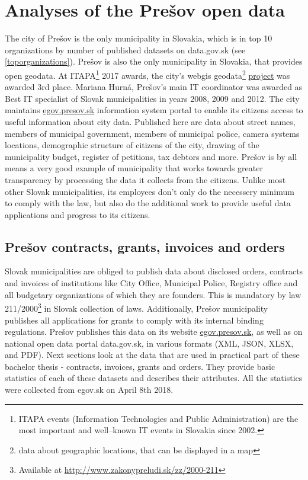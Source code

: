 \documentclass[thesis=B,english]{FITthesis}[2012/06/26]
\begin{document}
\chapter{Analyses of the Prešov open data}
\label{presovopendata}
	The city of Prešov is the only municipality in Slovakia, which is in top 10 organizations by number of published datasets on data.gov.sk (see \ref{toporganizations}). Prešov is also the only municipality in Slovakia, that provides open geodata. At ITAPA\footnote{ITAPA events (Information Technologies and Public Administration) are the most important and well–known IT events in Slovakia since 2002.\cite{itapa}} 2017 awards, the city's webgis geodata\footnote{data about geographic locations, that can be displayed in a map} \href{http://webgis.presov.sk/}{project} was awarded 3rd place. Mariana Hurná, Prešov's main IT coordinator was awarded as Best IT specialist of Slovak municipalities in years 2008, 2009 and 2012. The city maintains \href{http://egov.presov.sk}{egov.presov.sk} information system  portal to enable its citizens access to useful information about city data. Published here are data about street names, members of municipal government, members of municipal police, camera systems locations, demographic structure of citizens of the city, drawing of the municipality budget, register of petitions, tax debtors and more. Prešov is by all means a very good example of municipality that works towards greater  transparency by processing the data it collects from the citizens. Unlike most other Slovak municipalities, its employees don't only do the necessery minimum to comply with the law, but also do the additional work to provide useful data applications and progress to its citizens.
	
	\section{Prešov contracts, grants, invoices and orders}
	\label{presovdataattributes}
	Slovak municipalities are obliged to publish data about disclosed orders, contracts and invoices of institutions like City Office, Municipal Police, Registry office and all budgetary organizations of which they are founders. This is mandatory by law 211/2000\footnote{Available at \url{http://www.zakonypreludi.sk/zz/2000-211}} in Slovak collection of laws. Additionally, Prešov municipality  publishes all applications for grants to comply with its internal binding regulations. Prešov publishes this data on its website \url{egov.presov.sk}, as well as on national open data portal data.gov.sk, in various formats (XML, JSON, XLSX, and PDF). Next sections look at the data that are used in practical part of these bachelor thesis - contracts, invoices, grants and orders. They provide basic statistics of each of these datasets and describes their attributes. All the statistics were collected from egov.sk on April 8th 2018.
\end{document}
